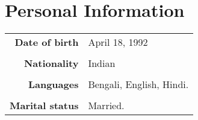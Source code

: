 \documentclass[10pt]{article}
\begin{document}
\section*{Personal Information}
\begin{longtable}{rp{14cm}}
{\bfseries Date of birth} & April 18, 1992\\\\
{\bfseries Nationality} & Indian\\\\
{\bfseries Languages} & Bengali, English, Hindi.\\\\
{\bfseries Marital status} & Married.
\end{longtable}
\end{document}
